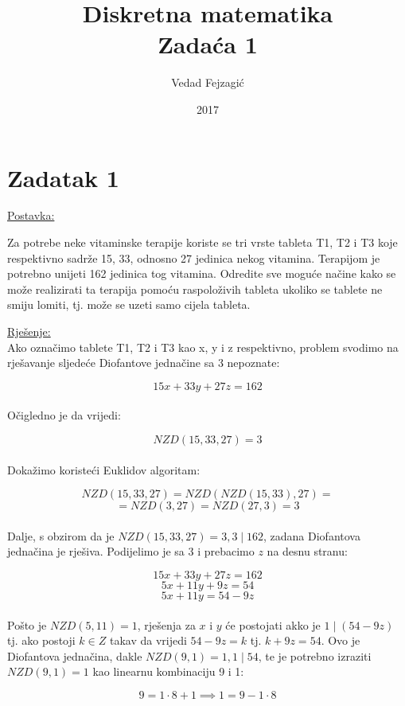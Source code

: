 \documentclass[12pt]{article}
\title{
  Diskretna matematika\\
  \large Zadaća 1 \\}
\author{Vedad Fejzagić}
\date{2017}
\begin{document}
\maketitle

\newpage

\section*{Zadatak 1\label{Z1}}

\underline{Postavka:}

Za potrebe neke vitaminske terapije koriste se tri vrste tableta T1, T2 i T3 koje respektivno sadrže 15, 33, odnosno 27 jedinica nekog vitamina. Terapijom je potrebno unijeti 162 jedinica tog vitamina. Odredite sve moguće načine kako se može realizirati ta terapija pomoću raspoloživih tableta ukoliko se tablete ne smiju lomiti, tj. može se uzeti samo cijela tableta.

\underline{Rješenje:}\\

\hspace{0.65cm}Ako označimo tablete T1, T2 i T3 kao x, y i z respektivno, problem svodimo na rješavanje sljedeće Diofantove jednačine sa 3 nepoznate:

$$15x + 33y + 27z = 162$$\\

Očigledno je da vrijedi:

$$NZD(15, 33, 27) = 3$$\\

Dokažimo koristeći Euklidov algoritam:

$$NZD(15, 33, 27) = NZD(NZD(15, 33), 27) =$$ 
$$= NZD(3, 27) = NZD(27, 3) = 3$$\\

Dalje, s obzirom da je $NZD(15, 33, 27) = 3, 3 \mid 162$, zadana Diofantova jednačina je rješiva. Podijelimo je sa $3$ i prebacimo $z$ na desnu stranu:

$$15x + 33y + 27z = 162$$
$$5x + 11y + 9z = 54$$
$$5x + 11y = 54 - 9z$$\\

Pošto je $NZD(5, 11) = 1$, rješenja za $x$ i $y$ će postojati akko je $1 \mid (54 - 9z)$ tj. ako postoji $k\in Z$ takav da vrijedi $54 - 9z = k$ tj. $k + 9z = 54$. Ovo je Diofantova jednačina, dakle $NZD(9, 1) = 1, 1 \mid 54$, te je potrebno izraziti $NZD(9, 1) = 1$ kao linearnu kombinaciju 9 i 1:

$$9 = 1 \cdot 8 + 1 \implies 1 = 9 - 1 \cdot 8$$\\
\end{document}
